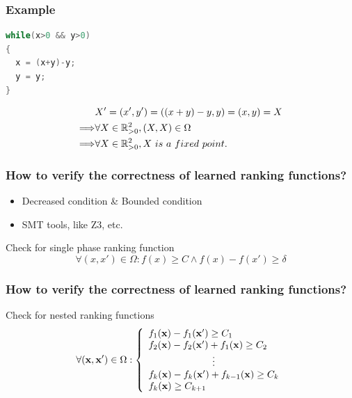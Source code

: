\begin{frame}[fragile]
\frametitle{Example}
\begin{lstlisting}[language=C++,
    xleftmargin=.3\textwidth, 
    xrightmargin=.3\textwidth]
while(x>0 && y>0)
{
  x = (x+y)-y;
  y = y;
}
\end{lstlisting}
\hl
\begin{align*}
&X' = (x',y') = ((x+y)-y,y) = (x,y) = X \\
\Longrightarrow &\forall X \in \reals^{2}_{>0}, (X,X) \in \Omega \\
\Longrightarrow &\forall X \in \reals^{2}_{>0}, X\ is\ a\ fixed\ point.
\end{align*}
\end{frame}

\begin{frame}
\frametitle{How to verify the correctness of learned ranking functions?}

\begin{itemize}
\item Decreased condition \& Bounded condition
\item SMT tools, like Z3, etc.
\end{itemize}

\begin{block}{Check for single phase ranking function}
\[
\forall (x,x') \in \Omega: f(x) \geq C \land f(x) - f(x') \geq \delta
\]

\end{block}

\end{frame}

\begin{frame}
\frametitle{How to verify the correctness of learned ranking functions?}

\begin{block}{Check for nested ranking functions}
	\begin{equation}
		\forall (\varsvec,\varsvec') \in \Omega :
		\left\{
			\begin{array}{ll}
				\affrank_{1}(\varsvec) - \affrank_{1}(\varsvec') \geq C_{1} \\
				\affrank_{2}(\varsvec) - \affrank_{2}(\varsvec') + \affrank_{1}(\varsvec) \geq C_{2} \\
				\multicolumn{1}{c}{\vdots} \\
				\affrank_{k}(\varsvec) - \affrank_{k}(\varsvec') + \affrank_{k-1}(\varsvec) \geq C_{k} \\
				\affrank_{k}(\varsvec) \geq C_{k+1}
			\end{array}
		\right. \notag
		\label{eq:nestedProgress}
	\end{equation}
	
\end{block}
\end{frame}

